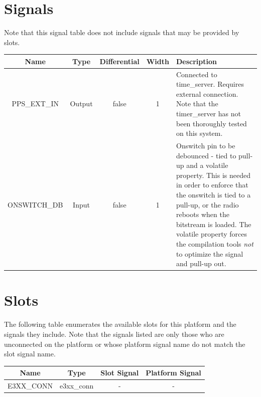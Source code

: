 \documentclass{article}
\begin{document}
\section*{Signals}
Note that this signal table does not include signals that may be provided by slots. \\
\begin{tabular}{|c|c|c|c|p{8cm}|}
	\hline
	\rowcolor{blue}
	Name           & Type   & Differential & Width & Description                                          \\
	\hline
	PPS\_EXT\_IN & Output & false        & 1     & Connected to time\_server. Requires external connection. Note that the timer\_server has not been thoroughly tested on this system.\\
	\hline
	ONSWITCH\_DB    & Input & false        & 1     & Onswitch pin to be debounced - tied to pull-up and a volatile property. This is needed in order to enforce that the onswitch is tied to a pull-up, or the radio reboots when the bitstream is loaded. The volatile property forces the compilation tools \textit{not} to optimize the signal and pull-up out.\\
	\hline
\end{tabular}
\pagebreak
\section*{Slots}
The following table enumerates the available slots for this platform and the signals they include. Note that the signals listed are only those who are unconnected on the platform or whose platform signal name do not match the slot signal name. \\
\begin{longtable}[l]{|c|c|c|c|}
	\hline
	\rowcolor{blue}
	Name           & Type & Slot Signal & Platform Signal  \\
	\hline
	E3XX\_CONN & e3xx\_conn & - & - \\
	\hline
\end{longtable}
\end{document}
